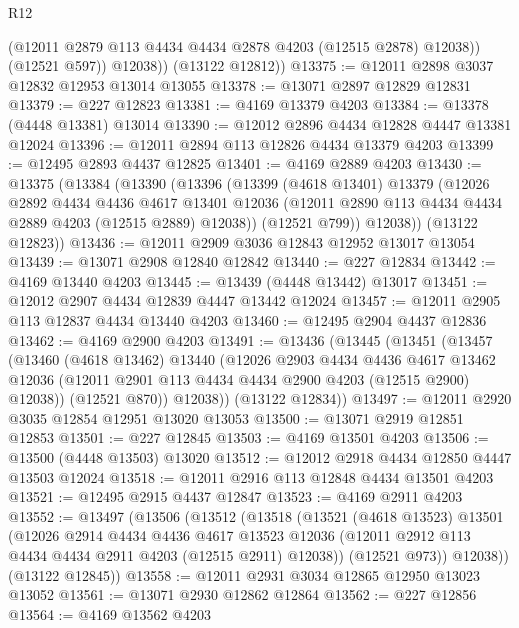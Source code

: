 \begin{lexlean}{R12}
\begin{coremodule}
              (@12011 @2879 @113 @4434 @4434 @2878 @4203 (@12515 @2878) @12038))
            (@12521 @597))
          @12038))
      (@13122 @12812))
@13375 := @12011 @2898 @3037 @12832 @12953 @13014 @13055
@13378 := @13071 @2897 @12829 @12831
@13379 := @227 @12823
@13381 := @4169 @13379 @4203
@13384 := @13378 (@4448 @13381) @13014
@13390 := @12012 @2896 @4434 @12828 @4447 @13381 @12024
@13396 := @12011 @2894 @113 @12826 @4434 @13379 @4203
@13399 := @12495 @2893 @4437 @12825
@13401 := @4169 @2889 @4203
@13430 := @13375
    (@13384
      (@13390
        (@13396
          (@13399
            (@4618 @13401)
            @13379
            (@12026
              @2892
              @4434
              @4436
              @4617
              @13401
              @12036
              (@12011 @2890 @113 @4434 @4434 @2889 @4203 (@12515 @2889) @12038))
            (@12521 @799))
          @12038))
      (@13122 @12823))
@13436 := @12011 @2909 @3036 @12843 @12952 @13017 @13054
@13439 := @13071 @2908 @12840 @12842
@13440 := @227 @12834
@13442 := @4169 @13440 @4203
@13445 := @13439 (@4448 @13442) @13017
@13451 := @12012 @2907 @4434 @12839 @4447 @13442 @12024
@13457 := @12011 @2905 @113 @12837 @4434 @13440 @4203
@13460 := @12495 @2904 @4437 @12836
@13462 := @4169 @2900 @4203
@13491 := @13436
    (@13445
      (@13451
        (@13457
          (@13460
            (@4618 @13462)
            @13440
            (@12026
              @2903
              @4434
              @4436
              @4617
              @13462
              @12036
              (@12011 @2901 @113 @4434 @4434 @2900 @4203 (@12515 @2900) @12038))
            (@12521 @870))
          @12038))
      (@13122 @12834))
@13497 := @12011 @2920 @3035 @12854 @12951 @13020 @13053
@13500 := @13071 @2919 @12851 @12853
@13501 := @227 @12845
@13503 := @4169 @13501 @4203
@13506 := @13500 (@4448 @13503) @13020
@13512 := @12012 @2918 @4434 @12850 @4447 @13503 @12024
@13518 := @12011 @2916 @113 @12848 @4434 @13501 @4203
@13521 := @12495 @2915 @4437 @12847
@13523 := @4169 @2911 @4203
@13552 := @13497
    (@13506
      (@13512
        (@13518
          (@13521
            (@4618 @13523)
            @13501
            (@12026
              @2914
              @4434
              @4436
              @4617
              @13523
              @12036
              (@12011 @2912 @113 @4434 @4434 @2911 @4203 (@12515 @2911) @12038))
            (@12521 @973))
          @12038))
      (@13122 @12845))
@13558 := @12011 @2931 @3034 @12865 @12950 @13023 @13052
@13561 := @13071 @2930 @12862 @12864
@13562 := @227 @12856
@13564 := @4169 @13562 @4203

\end{coremodule}
\end{lexlean}
